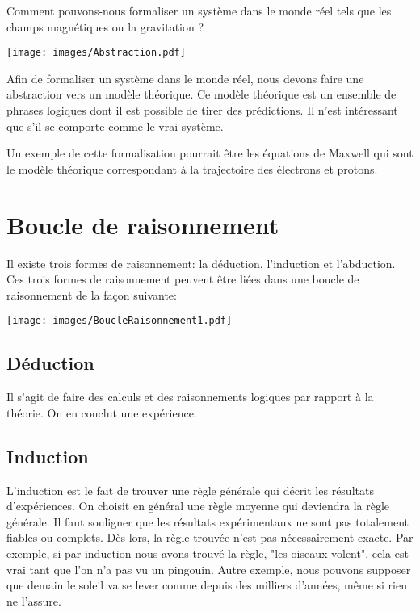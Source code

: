 Comment pouvons-nous formaliser un système dans le monde réel tels que les champs magnétiques ou la gravitation ?

\begin{center}
\texttt{[image: images/Abstraction.pdf]}
\end{center}

Afin de formaliser un système dans le monde réel, nous devons faire une abstraction vers un modèle théorique. Ce modèle théorique est un ensemble de phrases logiques dont il est possible de tirer des prédictions. Il n'est intéressant que s'il se comporte comme le vrai système.

Un exemple de cette formalisation pourrait être les équations de Maxwell qui sont le modèle théorique correspondant à la trajectoire des électrons et protons.

\section{Boucle de raisonnement}

Il existe trois formes de raisonnement: la déduction, l'induction et l'abduction. Ces trois formes de raisonnement peuvent être liées dans une boucle de raisonnement de la façon suivante:

\begin{center}
\texttt{[image: images/BoucleRaisonnement1.pdf]}
\end{center}

\subsection{Déduction}

Il s'agit de faire des calculs et des raisonnements logiques par rapport à la théorie. On en conclut une expérience. \\

\subsection{Induction}

L'induction est le fait de trouver une règle générale qui décrit les résultats d'expériences. On choisit en général une règle moyenne qui deviendra la règle générale.  Il faut souligner que les résultats expérimentaux ne sont pas totalement fiables ou complets. Dès lors, la règle trouvée n'est pas nécessairement exacte.  Par exemple, si par induction nous avons trouvé la règle, "les oiseaux volent", cela est vrai tant que l'on n’a pas vu un pingouin. Autre exemple, nous pouvons supposer que demain le soleil va se lever comme depuis des milliers d'années, même si rien ne l'assure.\\

